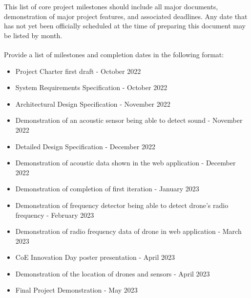 This list of core project milestones should include all major documents, demonstration of major project features, and associated deadlines. Any date that has not yet been officially scheduled at the time of preparing this document may be listed by month.
\\
\\
Provide a list of milestones and completion dates in the following format:
\begin{itemize}
  \item Project Charter first draft - October 2022
  \item System Requirements Specification - October 2022
  \item Architectural Design Specification - November 2022
  \item Demonstration of an acoustic sensor being able to detect sound - November 2022
  \item Detailed Design Specification - December 2022
  \item Demonstration of acoustic data shown in the web application - December 2022
  \item Demonstration of completion of first iteration - January 2023
  \item Demonstration of frequency detector being able to detect drone's radio frequency - February 2023
  \item Demonstration of radio frequency data of drone in web application - March 2023
  \item CoE Innovation Day poster presentation - April 2023
  \item Demonstration of the location of drones and sensors - April 2023
  \item Final Project Demonstration - May 2023
\end{itemize}
